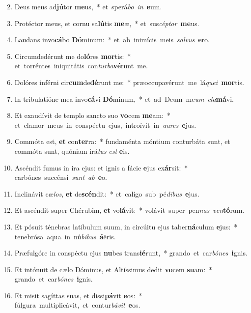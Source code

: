 \begin{flushleft}
\begin{enumerate}[leftmargin=*]
\setcounter{enumi}{1}

\item Deus meus ad\textbf{jú}tor \textbf{me}us,~* \mbox{et sperá{\it bo} {\it in} \textbf{e}um.}
\item Protéctor meus, et cornu sa\textbf{lú}tis \textbf{me}æ,~* \mbox{et sus{\it cép}{\it tor} \textbf{me}us.}
\item Laudans invo\textbf{cá}bo \textbf{Dó}minum:~* \mbox{et ab inimícis meis {\it sal}{\it vus} \textbf{e}ro.}
\item Circumdedérunt me do\textbf{ló}res \textbf{mor}tis:~* \mbox{et torréntes iniquitátis con{\it tur}{\it ba}\textbf{vé}runt me.}
\item Dolóres inférni cir\textbf{cum}de\textbf{dé}runt me:~* \mbox{præoccupavérunt me lá{\it que}{\it i} \textbf{mor}tis.}
\item In tribulatióne mea invo\textbf{cá}vi \textbf{Dó}minum,~* \mbox{et ad Deum me{\it um} {\it cla}\textbf{má}vi.}
\item Et exaudívit de templo sancto suo \textbf{vo}cem \textbf{me}am:~* \mbox{et clamor meus in conspéctu ejus, introívit in {\it au}{\it res} \textbf{e}jus.}
\item Commóta est, \textbf{et} con\textbf{ter}ra:~* fundaménta móntium conturbáta sunt, et commóta sunt, quóniam irá{\it tus} {\it est} \textbf{e}is.
\item Ascéndit fumus in ira ejus: et ignis a fácie \textbf{e}jus ex\textbf{ár}sit:~* \mbox{carbónes succénsi {\it sunt} {\it ab} \textbf{e}o.}
\item Inclinávit cæ{\it los}, \textbf{et} de\textbf{scén}dit:~* \mbox{et calígo sub pé{\it di}{\it bus} \textbf{e}jus.}
\item Et ascéndit super Chérubim, \textbf{et} vo\textbf{lá}vit:~* \mbox{volávit super pen{\it nas} {\it ven}\textbf{tó}rum.}
\item Et pósuit ténebras latíbulum suum, in circúitu ejus taber\textbf{ná}culum \textbf{e}jus:~* \mbox{tenebrósa aqua in nú{\it bi}{\it bus} \textbf{á}ëris.}
\item Præfulgóre in conspéctu ejus \textbf{nu}bes trans\textbf{ié}runt,~* \mbox{grando et car{\it bó}{\it nes} \textbf{i}gnis.}
\item Et intónuit de cælo Dóminus, et Altíssimus dedit \textbf{vo}cem \textbf{su}am:~* \mbox{grando et car{\it bó}{\it nes} \textbf{i}gnis.}
\item Et misit sagíttas suas, et dissi\textbf{pá}vit \textbf{e}os:~* \mbox{fúlgura multiplicávit, et contur{\it bá}{\it vit} \textbf{e}os.}

\end{enumerate}
\end{flushleft}
